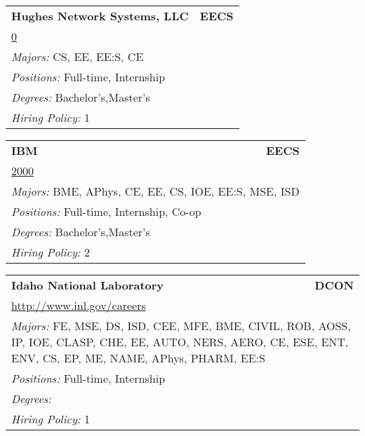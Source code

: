 \documentclass[twoside]{article}
\begin{document}
\begin{center}
\begin{multicols}{3}
\begin{FlushLeft}
\begin{minipage}{.9\columnwidth}
\end{minipage}
 
\begin{minipage}{.9\columnwidth}\begin{tabularx}{.95\columnwidth}{Xr}
                 {\Large\bf Hughes Network Systems, LLC} & {\Large\bf EECS}\\
    \multicolumn{2}{p{.95\columnwidth}}{\url{0}}\\
    \multicolumn{2}{p{.95\columnwidth}}{\emph{Majors:} CS, EE, EE:S, CE}\\
    \multicolumn{2}{p{.95\columnwidth}}{\emph{Positions:} Full-time, Internship}\\
    \multicolumn{2}{p{.95\columnwidth}}{\emph{Degrees:} Bachelor's,Master's}\\
    \multicolumn{2}{p{.95\columnwidth}}{\emph{Hiring Policy:} 1}\\
    \end{tabularx}
    
\end{minipage}
 
\begin{minipage}{.9\columnwidth}\begin{tabularx}{.95\columnwidth}{Xr}
                 {\Large\bf IBM} & {\Large\bf EECS}\\
    \multicolumn{2}{p{.95\columnwidth}}{\url{2000}}\\
    \multicolumn{2}{p{.95\columnwidth}}{\emph{Majors:} BME, APhys, CE, EE, CS, IOE, EE:S, MSE, ISD}\\
    \multicolumn{2}{p{.95\columnwidth}}{\emph{Positions:} Full-time, Internship, Co-op}\\
    \multicolumn{2}{p{.95\columnwidth}}{\emph{Degrees:} Bachelor's,Master's}\\
    \multicolumn{2}{p{.95\columnwidth}}{\emph{Hiring Policy:} 2}\\
    \end{tabularx}
    
\end{minipage}
 
\begin{minipage}{.9\columnwidth}\begin{tabularx}{.95\columnwidth}{Xr}
                 {\Large\bf Idaho National Laboratory} & {\Large\bf DCON}\\
    \multicolumn{2}{p{.95\columnwidth}}{\url{http://www.inl.gov/careers}}\\
    \multicolumn{2}{p{.95\columnwidth}}{\emph{Majors:} FE, MSE, DS, ISD, CEE, MFE, BME, CIVIL, ROB, AOSS, IP, IOE, CLASP, CHE, EE, AUTO, NERS, AERO, CE, ESE, ENT, ENV, CS, EP, ME, NAME, APhys, PHARM, EE:S}\\
    \multicolumn{2}{p{.95\columnwidth}}{\emph{Positions:} Full-time, Internship}\\
    \multicolumn{2}{p{.95\columnwidth}}{\emph{Degrees:} }\\
    \multicolumn{2}{p{.95\columnwidth}}{\emph{Hiring Policy:} 1}\\
    \end{tabularx}
    

\end{minipage}
\end{FlushLeft}
\end{multicols}
\end{center}
\end{document}

